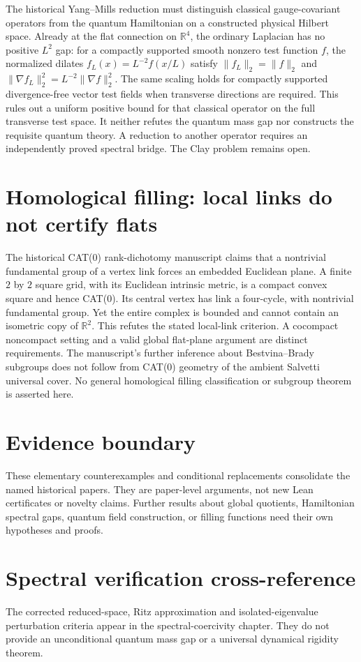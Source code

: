 The historical Yang--Mills reduction must distinguish classical gauge-covariant operators from the quantum Hamiltonian on a constructed physical Hilbert space. Already at the flat connection on $\mathbb R^4$, the ordinary Laplacian has no positive $L^2$ gap: for a compactly supported smooth nonzero test function $f$, the normalized dilates $f_L(x)=L^{-2}f(x/L)$ satisfy $\|f_L\|_2=\|f\|_2$ and $\|\nabla f_L\|_2^2=L^{-2}\|\nabla f\|_2^2$. The same scaling holds for compactly supported divergence-free vector test fields when transverse directions are required. This rules out a uniform positive bound for that classical operator on the full transverse test space. It neither refutes the quantum mass gap nor constructs the requisite quantum theory. A reduction to another operator requires an independently proved spectral bridge. The Clay problem remains open.

\section{Homological filling: local links do not certify flats}
The historical CAT(0) rank-dichotomy manuscript claims that a nontrivial fundamental group of a vertex link forces an embedded Euclidean plane. A finite $2$ by $2$ square grid, with its Euclidean intrinsic metric, is a compact convex square and hence CAT(0). Its central vertex has link a four-cycle, with nontrivial fundamental group. Yet the entire complex is bounded and cannot contain an isometric copy of $\mathbb R^2$. This refutes the stated local-link criterion. A cocompact noncompact setting and a valid global flat-plane argument are distinct requirements. The manuscript's further inference about Bestvina--Brady subgroups does not follow from CAT(0) geometry of the ambient Salvetti universal cover. No general homological filling classification or subgroup theorem is asserted here.

\section{Evidence boundary}
These elementary counterexamples and conditional replacements consolidate the named historical papers. They are paper-level arguments, not new Lean certificates or novelty claims. Further results about global quotients, Hamiltonian spectral gaps, quantum field construction, or filling functions need their own hypotheses and proofs.

\section{Spectral verification cross-reference}
The corrected reduced-space, Ritz approximation and isolated-eigenvalue perturbation criteria appear in the spectral-coercivity chapter. They do not provide an unconditional quantum mass gap or a universal dynamical rigidity theorem.
